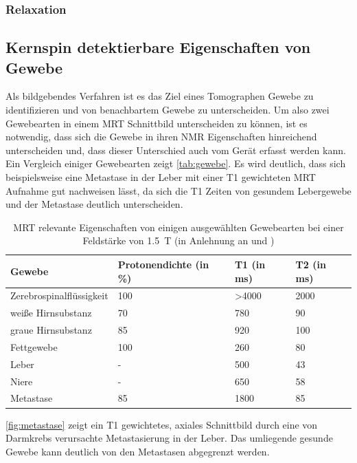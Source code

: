 

\subsubsection{Relaxation}

\subsection{Kernspin detektierbare Eigenschaften von Gewebe}
Als bildgebendes Verfahren ist es das Ziel eines Tomographen Gewebe zu identifizieren und von benachbartem Gewebe zu unterscheiden. Um also zwei Gewebearten in einem MRT Schnittbild unterscheiden zu können, ist es notwendig, dass sich die Gewebe in ihren NMR Eigenschaften hinreichend unterscheiden und, dass dieser Unterschied auch vom Gerät erfasst werden kann. Ein Vergleich einiger Gewebearten zeigt \autoref{tab:gewebe}. Es wird deutlich, dass sich beispielsweise eine Metastase in der Leber mit einer T1 gewichteten MRT Aufnahme gut nachweisen lässt, da sich die T1 Zeiten von gesundem Lebergewebe und der Metastase deutlich unterscheiden.

\begin{table}[H]
	\centering
	\caption[MRT relevante Eigenschaften ausgewählter Gewebe]{MRT relevante Eigenschaften von einigen ausgewählten Gewebearten bei einer Feldstärke von \SI{1.5}{\tesla} (in Anlehnung an \cite[S.~16]{Weishaupt2014} und \cite[S.~17]{Reiser2008})}
	\label{tab:gewebe}
	\begin{tabular}{llll}
		\toprule
		\textbf{Gewebe} & \textbf{Protonendichte (in \%)} & \textbf{T1 (in ms)} & \textbf{T2 (in ms)} \\
		\midrule
		Zerebrospinalflüssigkeit & 100 & \textgreater4000 & 2000 \\
		weiße Hirnsubstanz & 70 & 780 & 90 \\
		graue Hirnsubstanz & 85 & 920 & 100 \\
		Fettgewebe & 100 & 260 & 80 \\
		Leber & - & 500 & 43 \\
		Niere & - & 650 & 58 \\
		Metastase & 85 & 1800 & 85 \\
		\bottomrule
	\end{tabular}
\end{table}

\autoref{fig:metastase} zeigt ein T1 gewichtetes, axiales Schnittbild durch eine von Darmkrebs verursachte Metastasierung in der Leber. Das umliegende gesunde Gewebe kann deutlich von den Metastasen abgegrenzt werden.

